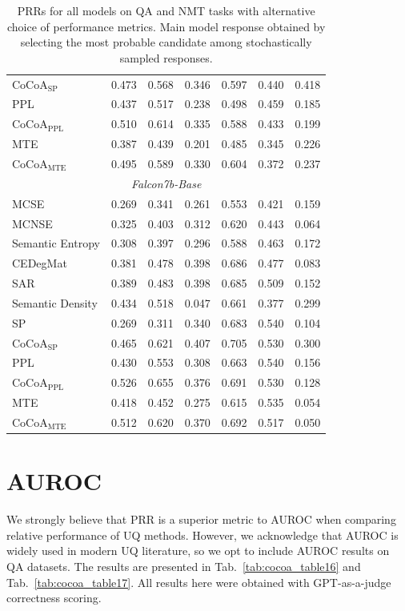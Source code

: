 \documentclass[11pt]{article}
\newcommand{\tabref}[1]{Tab.~\ref{#1}}
\begin{document}
\begin{table}[htbp]
{\begin{tabular}{l cc cccc}
CoCoA$_{\mathrm{SP}}$ & 0.473 & 0.568 & 0.346 & 0.597 & 0.440 & 0.418 \\
PPL & 0.437 & 0.517 & 0.238 & 0.498 & 0.459 & 0.185 \\
CoCoA$_{\mathrm{PPL}}$ & 0.510 & 0.614 & 0.335 & 0.588 & 0.433 & 0.199 \\
MTE & 0.387 & 0.439 & 0.201 & 0.485 & 0.345 & 0.226 \\
CoCoA$_{\mathrm{MTE}}$ & 0.495 & 0.589 & 0.330 & 0.604 & 0.372 & 0.237 \\
\midrule
\multicolumn{7}{c}{\textit{Falcon7b-Base}} \\
\midrule
MCSE & 0.269 & 0.341 & 0.261 & 0.553 & 0.421 & 0.159 \\
MCNSE & 0.325 & 0.403 & 0.312 & 0.620 & 0.443 & 0.064 \\
Semantic Entropy & 0.308 & 0.397 & 0.296 & 0.588 & 0.463 & 0.172 \\
CEDegMat & 0.381 & 0.478 & 0.398 & 0.686 & 0.477 & 0.083 \\
SAR & 0.389 & 0.483 & 0.398 & 0.685 & 0.509 & 0.152 \\
Semantic Density & 0.434 & 0.518 & 0.047 & 0.661 & 0.377 & 0.299 \\
SP & 0.269 & 0.311 & 0.340 & 0.683 & 0.540 & 0.104 \\
CoCoA$_{\mathrm{SP}}$ & 0.465 & 0.621 & 0.407 & 0.705 & 0.530 & 0.300 \\
PPL & 0.430 & 0.553 & 0.308 & 0.663 & 0.540 & 0.156 \\
CoCoA$_{\mathrm{PPL}}$ & 0.526 & 0.655 & 0.376 & 0.691 & 0.530 & 0.128 \\
MTE & 0.418 & 0.452 & 0.275 & 0.615 & 0.535 & 0.054 \\
CoCoA$_{\mathrm{MTE}}$ & 0.512 & 0.620 & 0.370 & 0.692 & 0.517 & 0.050 \\
\bottomrule
\end{tabular}%
}
\caption{PRRs for all models on QA and NMT tasks with alternative choice of performance metrics. Main model response obtained by selecting the most probable candidate among stochastically sampled responses.}
\label{tab:cocoa_table15}
\end{table}
\section{AUROC}
\label{app:auroc}

We strongly believe that PRR is a superior metric to AUROC when comparing relative performance of UQ methods. However, we acknowledge that AUROC is widely used in modern UQ literature, so we opt to include AUROC results on QA datasets. The results are presented in \tabref{tab:cocoa_table16} and \tabref{tab:cocoa_table17}. All results here were obtained with GPT-as-a-judge correctness scoring.
\end{document}
